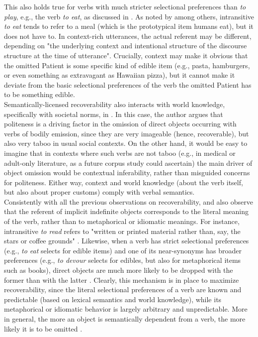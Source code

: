 This also holds true for verbs with much stricter selectional preferences than \textit{to play}, e.g., the verb \textit{to eat}, as discussed in . As noted by \textcite[149]{Cote1996} among others, intransitive \textit{to eat} tends to refer to a meal (which is the prototypical item humans eat), but it does not have to. In context-rich utterances, the actual referent may be different, depending on "the underlying context and intentional structure of the discourse structure at the time of utterance". Crucially, context may make it obvious that the omitted Patient is some specific kind of edible item (e.g., pasta, hamburgers, or even something as extravagant as Hawaiian pizza), but it cannot make it deviate from the basic selectional preferences of the verb \textemdash the omitted Patient has to be something edible.\\
Semantically-licensed recoverability also interacts with world knowledge, specifically with societal norms, in \textcite{Goldberg2005}. In this case, the author argues that politeness is a driving factor in the omission of direct objects occurring with verbs of bodily emission, since they are very imageable (hence, recoverable), but also very taboo in usual social contexts. On the other hand, it would be easy to imagine that in contexts where such verbs are not taboo (e.g., in medical or adult-only literature, as a future corpus study could ascertain) the main driver of object omission would be contextual inferability, rather than misguided concerns for politeness. Either way, context and world knowledge (about the verb itself, but also about proper customs) comply with verbal semantics.\\
Consistently with all the previous observations on recoverability, \textcite{Mittwoch2005} and \textcite{Glass2013} also observe that the referent of implicit indefinite objects corresponds to the literal meaning of the verb, rather than to metaphorical or idiomatic meanings. For instance, intransitive \textit{to read} refers to "written or printed material rather than, say, the stars or coffee grounds" \parencite[2]{Mittwoch2005}. Likewise, when a verb has strict selectional preferences (e.g., \textit{to eat} selects for edible items) and one of its near-synonyms has broader preferences (e.g., \textit{to devour} selects for edibles, but also for metaphorical items such as books), direct objects are much more likely to be dropped with the former than with the latter \parencite[5]{Glass2013}. Clearly, this mechanism is in place to maximize recoverability, since the literal selectional preferences of a verb are known and predictable (based on lexical semantics and world knowledge), while its metaphorical or idiomatic behavior is largely arbitrary and unpredictable. More in general, the more an object is semantically dependent from a verb, the more likely it is to be omitted \parencite[203-204]{Rice1988}.


